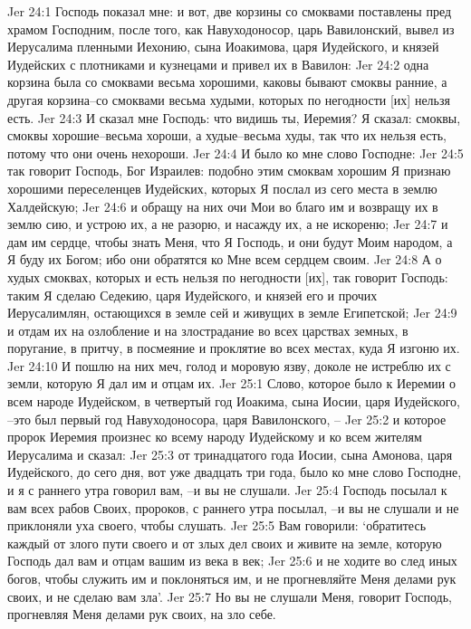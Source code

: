 Jer 24:1  Господь показал мне: и вот, две корзины со смоквами поставлены пред храмом Господним, после того, как Навуходоносор, царь Вавилонский, вывел из Иерусалима пленными Иехонию, сына Иоакимова, царя Иудейского, и князей Иудейских с плотниками и кузнецами и привел их в Вавилон:
Jer 24:2  одна корзина была со смоквами весьма хорошими, каковы бывают смоквы ранние, а другая корзина--со смоквами весьма худыми, которых по негодности [их] нельзя есть.
Jer 24:3  И сказал мне Господь: что видишь ты, Иеремия? Я сказал: смоквы, смоквы хорошие--весьма хороши, а худые--весьма худы, так что их нельзя есть, потому что они очень нехороши.
Jer 24:4  И было ко мне слово Господне:
Jer 24:5  так говорит Господь, Бог Израилев: подобно этим смоквам хорошим Я признаю хорошими переселенцев Иудейских, которых Я послал из сего места в землю Халдейскую;
Jer 24:6  и обращу на них очи Мои во благо им и возвращу их в землю сию, и устрою их, а не разорю, и насажду их, а не искореню;
Jer 24:7  и дам им сердце, чтобы знать Меня, что Я Господь, и они будут Моим народом, а Я буду их Богом; ибо они обратятся ко Мне всем сердцем своим.
Jer 24:8  А о худых смоквах, которых и есть нельзя по негодности [их], так говорит Господь: таким Я сделаю Седекию, царя Иудейского, и князей его и прочих Иерусалимлян, остающихся в земле сей и живущих в земле Египетской;
Jer 24:9  и отдам их на озлобление и на злострадание во всех царствах земных, в поругание, в притчу, в посмеяние и проклятие во всех местах, куда Я изгоню их.
Jer 24:10  И пошлю на них меч, голод и моровую язву, доколе не истреблю их с земли, которую Я дал им и отцам их.
Jer 25:1  Слово, которое было к Иеремии о всем народе Иудейском, в четвертый год Иоакима, сына Иосии, царя Иудейского, --это был первый год Навуходоносора, царя Вавилонского, --
Jer 25:2  и которое пророк Иеремия произнес ко всему народу Иудейскому и ко всем жителям Иерусалима и сказал:
Jer 25:3  от тринадцатого года Иосии, сына Амонова, царя Иудейского, до сего дня, вот уже двадцать три года, было ко мне слово Господне, и я с раннего утра говорил вам, --и вы не слушали.
Jer 25:4  Господь посылал к вам всех рабов Своих, пророков, с раннего утра посылал, --и вы не слушали и не приклоняли уха своего, чтобы слушать.
Jer 25:5  Вам говорили: `обратитесь каждый от злого пути своего и от злых дел своих и живите на земле, которую Господь дал вам и отцам вашим из века в век;
Jer 25:6  и не ходите во след иных богов, чтобы служить им и поклоняться им, и не прогневляйте Меня делами рук своих, и не сделаю вам зла'.
Jer 25:7  Но вы не слушали Меня, говорит Господь, прогневляя Меня делами рук своих, на зло себе.
